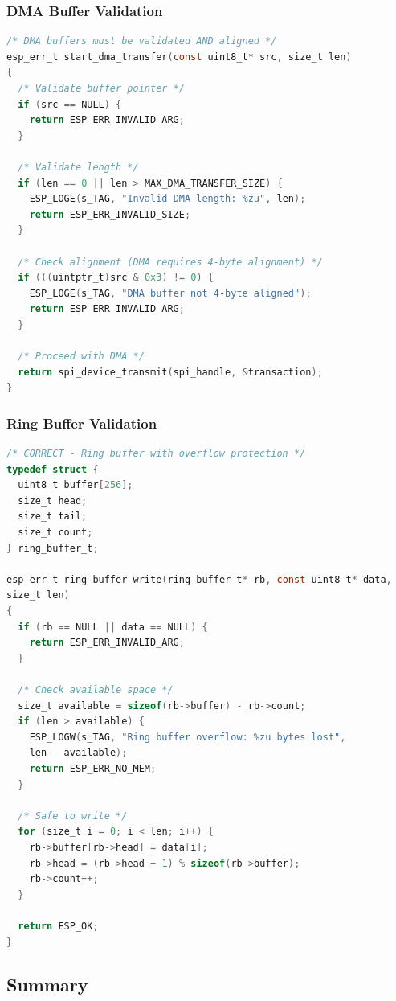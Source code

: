 \subsubsection{DMA Buffer Validation}

\begin{lstlisting}[language=C]
/* DMA buffers must be validated AND aligned */
esp_err_t start_dma_transfer(const uint8_t* src, size_t len)
{
  /* Validate buffer pointer */
  if (src == NULL) {
    return ESP_ERR_INVALID_ARG;
  }
  
  /* Validate length */
  if (len == 0 || len > MAX_DMA_TRANSFER_SIZE) {
    ESP_LOGE(s_TAG, "Invalid DMA length: %zu", len);
    return ESP_ERR_INVALID_SIZE;
  }
  
  /* Check alignment (DMA requires 4-byte alignment) */
  if (((uintptr_t)src & 0x3) != 0) {
    ESP_LOGE(s_TAG, "DMA buffer not 4-byte aligned");
    return ESP_ERR_INVALID_ARG;
  }
  
  /* Proceed with DMA */
  return spi_device_transmit(spi_handle, &transaction);
}


\end{lstlisting}
\subsubsection{Ring Buffer Validation}

\begin{lstlisting}[language=C]
/* CORRECT - Ring buffer with overflow protection */
typedef struct {
  uint8_t buffer[256];
  size_t head;
  size_t tail;
  size_t count;
} ring_buffer_t;

esp_err_t ring_buffer_write(ring_buffer_t* rb, const uint8_t* data,
size_t len)
{
  if (rb == NULL || data == NULL) {
    return ESP_ERR_INVALID_ARG;
  }
  
  /* Check available space */
  size_t available = sizeof(rb->buffer) - rb->count;
  if (len > available) {
    ESP_LOGW(s_TAG, "Ring buffer overflow: %zu bytes lost",
    len - available);
    return ESP_ERR_NO_MEM;
  }
  
  /* Safe to write */
  for (size_t i = 0; i < len; i++) {
    rb->buffer[rb->head] = data[i];
    rb->head = (rb->head + 1) % sizeof(rb->buffer);
    rb->count++;
  }
  
  return ESP_OK;
}


\end{lstlisting}
\subsection{Summary}

